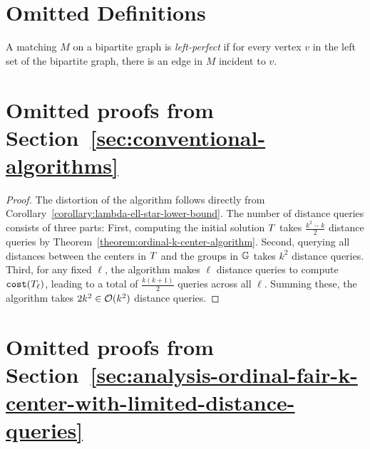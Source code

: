 





\section{Omitted Definitions  }
\begin{definition}
    \label{definition:left-perfect-matching}
    A matching $M$ on a bipartite graph is \emph{left-perfect} if for every vertex $v$ in the left set of the bipartite graph, there is an edge in $M$ incident to $v$.
\end{definition}

\section{Omitted proofs from Section~\ref{sec:conventional-algorithms}}

\naiveapproach*
\begin{proof}
The distortion of the algorithm follows directly from Corollary~\ref{corollary:lambda-ell-star-lower-bound}. The number of distance queries consists of three parts: First, computing the initial solution $T$ takes $\frac{k^2 - k}{2}$ distance queries by Theorem~\ref{theorem:ordinal-k-center-algorithm}. Second, querying all distances between the centers in $T$ and the groups in $\mathbb{G}$ takes $k^2$ distance queries. Third, for any fixed $\ell$, the algorithm makes $\ell$ distance queries to compute $\texttt{cost}(T_{\ell})$, leading to a total of $\frac{k(k+1)}{2}$ queries across all $\ell$. Summing these, the algorithm takes $2 k^2 \in \mathcal{O}(k^2)$ distance queries.
\end{proof}

\section{Omitted proofs from Section~\ref{sec:analysis-ordinal-fair-k-center-with-limited-distance-queries}}



